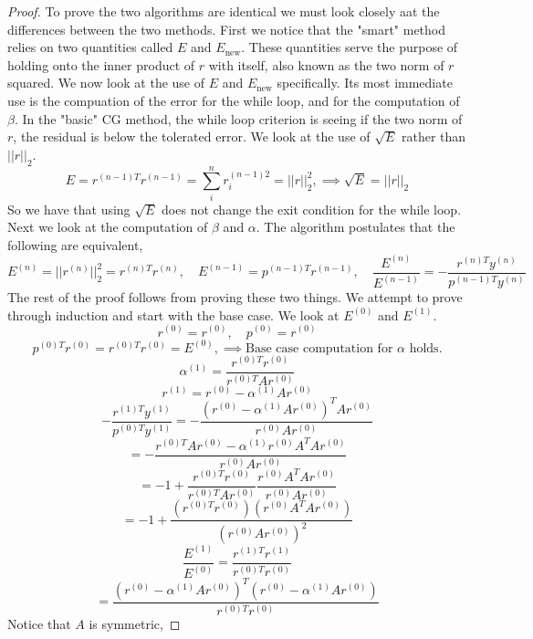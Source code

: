 \documentclass{article}
\begin{document}
\begin{enumerate}
        \begin{proof}
            To prove the two algorithms are identical we must look closely aat the differences between the two methods. First we notice that the "smart" method relies on two quantities called $E$ and $E_{\text{new}}$. These quantities serve the purpose of holding onto the inner product of $r$ with itself, also known as the two norm of $r$ squared. We now look at the use of $E$ and $E_{\text{new}}$ specifically. Its most immediate use is the compuation of the error for the while loop, and for the computation of $\beta$. In the "basic" CG method, the while loop criterion is seeing if the two norm of $r$, the residual is below the tolerated error. We look at the use of $\sqrt{E}$ rather than $||r||_2$. 
        \[
            E = r^{(n-1)T}r^{(n-1)} = \sum_i^n r_i^{(n-1)2} = ||r||_2^2, \implies \sqrt{E} = ||r||_2
        \]
        So we have that using $\sqrt{E}$ does not change the exit condition for the while loop. Next we look at the computation of $\beta$ and $\alpha$. The algorithm postulates that the following are equivalent, 
        \[
            E^{(n)} = ||r^{(n)}||_2^2 = r^{(n)T}r^{(n)}, \quad E^{(n-1)} = p^{(n-1)T}r^{(n-1)}, \quad \frac{E^{(n)}}{E^{(n-1)}} = -\frac{r^{(n)T}y^{(n)}}{p^{(n-1)T}y^{(n)}}
        \]
        The rest of the proof follows from proving these two things. We attempt to prove through induction and start with the base case. We look at $E^{(0)}$ and $E^{(1)}$. 
        \[
            r^{(0)} = r^{(0)},\quad p^{(0)} = r^{(0)}
        \]
        \[
            p^{(0)T}r^{(0)} = r^{(0)T}r^{(0)} = E^{(0)}, \implies \text{Base case computation for $\alpha$ holds.}
        \]
        \[
            \alpha^{(1)} = \frac{r^{(0)T}r^{(0)}}{r^{(0)T}Ar^{(0)}} 
        \]
        \[
            r^{(1)} = r^{(0)} - \alpha^{(1)}Ar^{(0)}
        \]
        \[
            -\frac{r^{(1)T}y^{(1)}}{p^{(0)T}y^{(1)}} = -\frac{(r^{(0)} - \alpha^{(1)}Ar^{(0)})^TAr^{(0)}}{r^{(0)}Ar^{(0)}} 
        \]
        \[
            = - \frac{r^{(0)T}Ar^{(0)} - \alpha^{(1)}r^{(0)}A^TAr^{(0)}}{r^{(0)}Ar^{(0)}}
        \]
        \[
            = -1 + \frac{r^{(0)T}r^{(0)}}{r^{(0)T}Ar^{(0)}}\frac{r^{(0)}A^TAr^{(0)}}{r^{(0)}Ar^{(0)}}
        \]
        \[
            = -1 + \frac{(r^{(0)T}r^{(0)})(r^{(0)}A^TAr^{(0)})}{(r^{(0)}Ar^{(0)})^2}
        \]
        \[
            \frac{E^{(1)}}{E^{(0)}} = \frac{r^{(1)T}r^{(1)}}{r^{(0)T}r^{(0)}}
        \]
        \[
            = \frac{(r^{(0)} - \alpha^{(1)}Ar^{(0)})^T(r^{(0)} - \alpha^{(1)}Ar^{(0)})}{r^{(0)T}r^{(0)}}
        \]
        Notice that $A$ is symmetric, 

\end{proof}
\end{enumerate}
\end{document}
